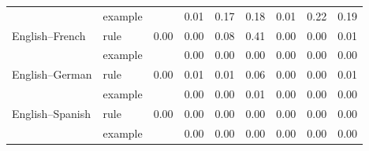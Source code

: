 \begin{tabular}{@{}llccccccc@{}}
 & example &  & 0.01 & 0.17 & 0.18 & 0.01 & 0.22 & 0.19 \\
English--French & rule & 0.00 & 0.00 & 0.08 & 0.41 & 0.00 & 0.00 & 0.01 \\
 & example &  & 0.00 & 0.00 & 0.00 & 0.00 & 0.00 & 0.00 \\
English--German & rule & 0.00 & 0.01 & 0.01 & 0.06 & 0.00 & 0.00 & 0.01 \\
 & example &  & 0.00 & 0.00 & 0.01 & 0.00 & 0.00 & 0.00 \\
English--Spanish & rule & 0.00 & 0.00 & 0.00 & 0.00 & 0.00 & 0.00 & 0.00 \\
 & example &  & 0.00 & 0.00 & 0.00 & 0.00 & 0.00 & 0.00 \\
\bottomrule
\end{tabular}
